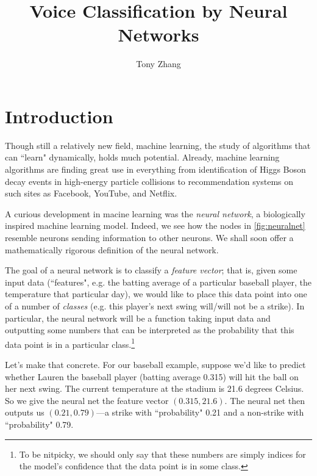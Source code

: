 \documentclass{article}
\title{Voice Classification by Neural Networks}
\author{Tony Zhang}
\begin{document}
\maketitle

\begin{abstract}
% 
\end{abstract}

\section{Introduction}


Though still a relatively new field, machine learning, the study of algorithms that can ``learn" dynamically, holds much potential. Already, machine learning algorithms are finding great use in everything from identification of Higgs Boson decay events in high-energy particle collisions to recommendation systems on such sites as Facebook, YouTube, and Netflix.

A curious development in macine learning was the \emph{neural network}, a biologically inspired machine learning model. Indeed, we see how the nodes in \cref{fig:neuralnet} resemble neurons sending information to other neurons. We shall soon offer a mathematically rigorous definition of the neural network.

The goal of a neural network is to classify a \emph{feature vector}; that is, given some input data (``features", e.g. the batting average of a particular baseball player, the temperature that particular day), we would like to place this data point into one of a number of \emph{classes} (e.g. this player's next swing will/will not be a strike). In particular, the neural network will be a function taking input data and outputting some numbers that can be interpreted as the probability that this data point is in a particular class.\footnote{To be nitpicky, we should only say that these numbers are simply indices for the model's confidence that the data point is in some class.}

Let's make that concrete. For our baseball example, suppose we'd like to predict whether Lauren the baseball player (batting average 0.315) will hit the ball on her next swing. The current temperature at the stadium is 21.6 degrees Celsius. So we give the neural net the feature vector $(0.315, 21.6)$. The neural net then outputs us $(0.21, 0.79)$---a strike with ``probability" 0.21 and a non-strike with ``probability" 0.79.
\end{document}
